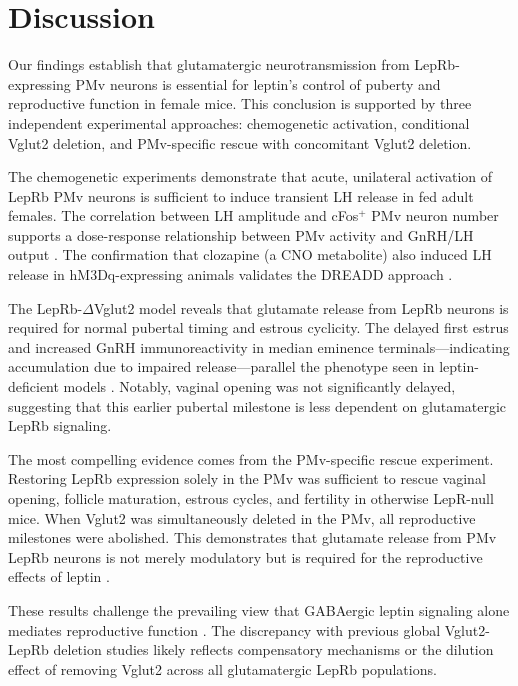 \documentclass[11pt]{article}
\begin{document}
\section{Discussion}

Our findings establish that glutamatergic neurotransmission from LepRb-expressing PMv neurons is essential for leptin's control of puberty and reproductive function in female mice. This conclusion is supported by three independent experimental approaches: chemogenetic activation, conditional Vglut2 deletion, and PMv-specific rescue with concomitant Vglut2 deletion.

The chemogenetic experiments demonstrate that acute, unilateral activation of LepRb PMv neurons is sufficient to induce transient LH release in fed adult females. The correlation between LH amplitude and cFos$^+$ PMv neuron number supports a dose-response relationship between PMv activity and GnRH/LH output \citep{donato2011leptin, ross2018pmv}. The confirmation that clozapine (a CNO metabolite) also induced LH release in hM3Dq-expressing animals validates the DREADD approach \citep{alexander2009remote}.

The LepRb-$\Delta$Vglut2 model reveals that glutamate release from LepRb neurons is required for normal pubertal timing and estrous cyclicity. The delayed first estrus and increased GnRH immunoreactivity in median eminence terminals---indicating accumulation due to impaired release---parallel the phenotype seen in leptin-deficient models \citep{barash1996leptin, herbison2016gnrh}. Notably, vaginal opening was not significantly delayed, suggesting that this earlier pubertal milestone is less dependent on glutamatergic LepRb signaling.

The most compelling evidence comes from the PMv-specific rescue experiment. Restoring LepRb expression solely in the PMv was sufficient to rescue vaginal opening, follicle maturation, estrous cycles, and fertility in otherwise LepR-null mice. When Vglut2 was simultaneously deleted in the PMv, all reproductive milestones were abolished. This demonstrates that glutamate release from PMv LepRb neurons is not merely modulatory but is required for the reproductive effects of leptin \citep{donato2011leptin, bellefontaine2014pmv}.

These results challenge the prevailing view that GABAergic leptin signaling alone mediates reproductive function \citep{vong2011leptin, zuure2013leptin}. The discrepancy with previous global Vglut2-LepRb deletion studies likely reflects compensatory mechanisms or the dilution effect of removing Vglut2 across all glutamatergic LepRb populations.
\end{document}
